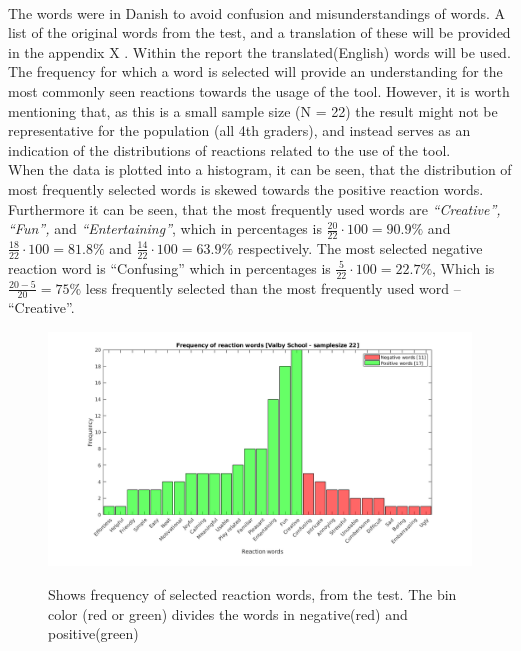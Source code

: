 \newline
\\
The words were in Danish to avoid confusion and misunderstandings of words.  A list of the original words from the test, and a translation of these will be provided in the appendix X . Within the report the translated(English) words will be used. 
The frequency for which a word is selected will provide an understanding for the most commonly seen reactions towards the usage of the tool. However, it is worth mentioning that, as this is a small sample size (N = 22) the result might not be representative for the population (all 4th graders), and instead serves as an indication of the distributions of reactions related to the use of the tool. 
\newline
\\
When the data is plotted into a histogram, it can be seen, that the distribution of most frequently selected words is skewed towards the positive reaction words. Furthermore it can be seen, that the most frequently used words are  \textit{“Creative”, “Fun”,} and \textit{“Entertaining”}, which in percentages is $\frac{20}{22}\cdot100 = 90.9\%$ and $\frac{18}{22}\cdot100 = 81.8\%$ and $\frac{14}{22}\cdot100 = 63.9\%$ respectively. The most selected negative reaction word is “Confusing” which in percentages is $\frac{5}{22}\cdot100 = 22.7\%$, Which is $\frac{20-5}{20}= 75\%$ less frequently selected than the most frequently used word – “Creative”.




\begin{figure}[H]
	\centering
	\includegraphics[width=0.9\linewidth]{figure/Evaluation/histValby}
	\label{fig:valbyTest}
	\caption{Shows frequency of selected reaction words, from the test. The bin color (red or green) divides the words in negative(red) and positive(green) }
	
\end{figure}

